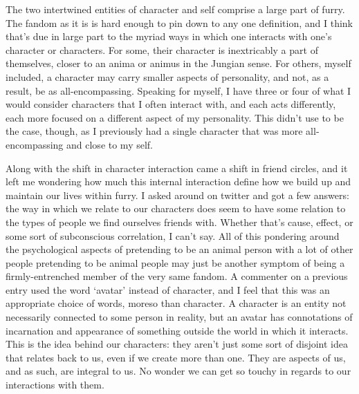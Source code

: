 The two intertwined entities of character and self comprise a large part of furry.  The fandom as it is is hard enough to pin down to any one definition, and I think that's due in large part to the myriad ways in which one interacts with one's character or characters.  For some, their character is inextricably a part of themselves, closer to an anima or animus in the Jungian sense.  For others, myself included, a character may carry smaller aspects of personality, and not, as a result, be as all-encompassing.  Speaking for myself, I have three or four of what I would consider characters that I often interact with, and each acts differently, each more focused on a different aspect of my personality.  This didn't use to be the case, though, as I previously had a single character that was more all-encompassing and close to my self.

Along with the shift in character interaction came a shift in friend circles, and it left me wondering how much this internal interaction define how we build up and maintain our lives within furry.  I asked around on twitter and got a few answers: the way in which we relate to our characters does seem to have some relation to the types of people we find ourselves friends with.  Whether that's cause, effect, or some sort of subconscious correlation, I can't say.  All of this pondering around the psychological aspects of pretending to be an animal person with a lot of other people pretending to be animal people may just be another symptom of being a firmly-entrenched member of the very same fandom.  A commenter on a previous entry used the word `avatar' instead of character, and I feel that this was an appropriate choice of words, moreso than character.  A character is an entity not necessarily connected to some person in reality, but an avatar has connotations of incarnation and appearance of something outside the world in which it interacts.  This is the idea behind our characters: they aren't just some sort of disjoint idea that relates back to us, even if we create more than one.  They are aspects of us, and as such, are integral to us.  No wonder we can get so touchy in regards to our interactions with them.
